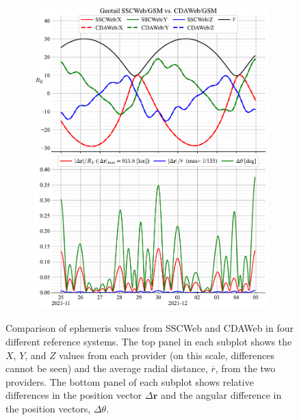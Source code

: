 \documentclass[draft]{agujournal2019}
\begin{document}
\begin{figure}[h]
\begin{subfigure}[b]{0.49\textwidth}
         \includegraphics[width=\textwidth]{code/figures/ephemeris/Geotail_SSCWeb-GSM_vs_CDAWeb-GSM.pdf}
     \end{subfigure}
     \caption{Comparison of ephemeris values from SSCWeb and CDAWeb in four different reference systems. The top panel in each subplot shows the $X$, $Y$, and $Z$ values from each provider (on this scale, differences cannot be seen) and the average radial distance, $\overline{r}$, from the two providers. The bottom panel of each subplot shows relative differences in the position vector $\Delta\mathbf{r}$ and the angular difference in the position vectors, $\Delta\theta$.}
     \label{fig:geotail}
\end{figure}

\clearpage
\end{document}
